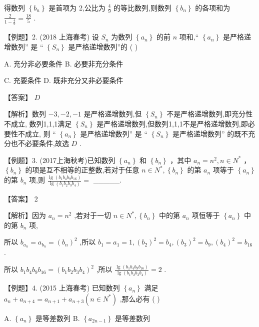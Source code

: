 \documentclass[10pt]{article}
\begin{document}
得数列 \(\left\{  {b}_{n}\right\}\) 是首项为 2,公比为 \(\frac{4}{9}\) 的等比数列,则数列 \(\left\{  {b}_{n}\right\}\) 的各项和为 \(\frac{2}{1 - \frac{4}{9}} = \frac{18}{5}\) .

【例题】2. (2018 上海春考) 设 \({S}_{n}\) 为数列 \(\left\{  {a}_{n}\right\}\) 的前 \(n\) 项和,“ \(\left\{  {a}_{n}\right\}\) 是严格递增数列” 是 “ \(\left\{  {S}_{n}\right\}\) 是严格递增数列”的 ( )

A. 充分非必要条件 B. 必要非充分条件

C. 充要条件 D. 既非充分又非必要条件

【答案】 \(D\)

【解析】数列 \(- 3, - 2, - 1\) 是严格递增数列,但 \(\left\{  {S}_{n}\right\}\) 不是严格递增数列,即充分性不成立, 数列1,1,1满足 \(\left\{  {S}_{n}\right\}\) 是严格递增数列,但数列1,1,1不是严格递增数列,即必要性不成立, 则 “ \(\left\{  {a}_{n}\right\}\) 是严格递增数列” 是 “ \(\left\{  {S}_{n}\right\}\) 是严格递增数列” 的既不充分也不必要条件,故选 \(D\) .

【例题】3. (2017上海秋考)已知数列 \(\left\{  {a}_{n}\right\}\) 和 \(\left\{  {b}_{n}\right\}\) ，其中 \({a}_{n} = {n}^{2},n \in  {N}^{ * }\) ， \(\left\{  {b}_{n}\right\}\) 的项是互不相等的正整数,若对于任意 \(n \in  {N}^{ * },\left\{  {b}_{n}\right\}\) 的第 \({a}_{n}\) 项等于 \(\left\{  {a}_{n}\right\}\) 的第 \({b}_{n}\) 项,则 \(\frac{\lg \left( {{b}_{1}{b}_{4}{b}_{9}{b}_{16}}\right) }{\lg \left( {{b}_{1}{b}_{2}{b}_{3}{b}_{4}}\right) } =\) \_\_\_\_\_.

【答案】 2

【解析】因为 \({a}_{n} = {n}^{2}\) ,若对于一切 \(n \in  {N}^{ * },\left\{  {b}_{n}\right\}\) 中的第 \({a}_{n}\) 项恒等于 \(\left\{  {a}_{n}\right\}\) 中的第 \({b}_{n}\) 项,

所以 \({b}_{{a}_{n}} = {a}_{{b}_{n}} = {\left( {b}_{n}\right) }^{2}\) ,所以 \({b}_{1} = {a}_{1} = 1,{\left( {b}_{2}\right) }^{2} = {b}_{4},{\left( {b}_{3}\right) }^{2} = {b}_{9},{\left( {b}_{4}\right) }^{2} = {b}_{16}\) .

所以 \({b}_{1}{b}_{4}{b}_{9}{b}_{16} = {\left( {b}_{1}{b}_{2}{b}_{3}{b}_{4}\right) }^{2}\) ,所以 \(\frac{\lg \left( {{b}_{1}{b}_{4}{b}_{9}{b}_{16}}\right) }{\lg \left( {{b}_{1}{b}_{2}{b}_{3}{b}_{4}}\right) } = 2\) .

【例题】4. (2015 上海春考) 已知数列 \(\left\{  {a}_{n}\right\}\) 满足 \({a}_{n} + {a}_{n + 4} = {a}_{n + 1} + {a}_{n + 3}\left( {n \in  {N}^{ * }}\right)\) ,那么必有 ( )

A. \(\left\{  {a}_{n}\right\}\) 是等差数列 B. \(\left\{  {a}_{{2n} - 1}\right\}\) 是等差数列
\end{document}
